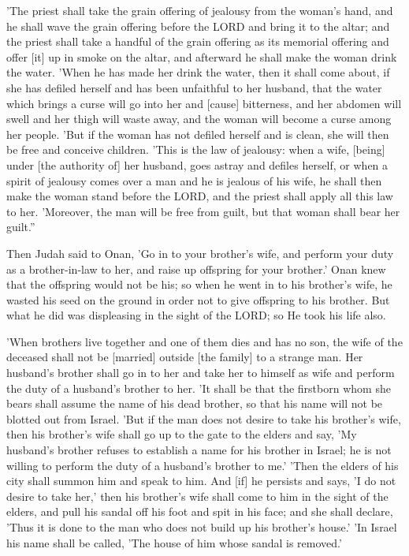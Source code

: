 \begin{scripture}[Numbers 5:11-31]
    'The priest shall take the grain offering of jealousy from the woman's hand, and he shall wave the grain offering before the LORD and bring it to the altar;
    and the priest shall take a handful of the grain offering as its memorial offering and offer [it] up in smoke on the altar, and afterward he shall make the woman drink the water.
    'When he has made her drink the water, then it shall come about, if she has defiled herself and has been unfaithful to her husband, that the water which brings a curse will go into her and [cause] bitterness, and her abdomen will swell and her thigh will waste away, and the woman will become a curse among her people.
    'But if the woman has not defiled herself and is clean, she will then be free and conceive children.
    'This is the law of jealousy: when a wife, [being] under [the authority of] her husband, goes astray and defiles herself,
    or when a spirit of jealousy comes over a man and he is jealous of his wife, he shall then make the woman stand before the LORD, and the priest shall apply all this law to her.
    'Moreover, the man will be free from guilt, but that woman shall bear her guilt.''
\end{scripture}

\begin{scripture}[Genesis 38:8-10]
    Then Judah said to Onan, 'Go in to your brother's wife, and perform your duty as a brother-in-law to her, and raise up offspring for your brother.'
    Onan knew that the offspring would not be his; so when he went in to his brother's wife, he wasted his seed on the ground in order not to give offspring to his brother.
    But what he did was displeasing in the sight of the LORD; so He took his life also.
\end{scripture}

\begin{scripture}[Deuteronomy 25:5-10]
    'When brothers live together and one of them dies and has no son, the wife of the deceased shall not be [married] outside [the family] to a strange man. Her husband's brother shall go in to her and take her to himself as wife and perform the duty of a husband's brother to her.
    'It shall be that the firstborn whom she bears shall assume the name of his dead brother, so that his name will not be blotted out from Israel.
    'But if the man does not desire to take his brother's wife, then his brother's wife shall go up to the gate to the elders and say, 'My husband's brother refuses to establish a name for his brother in Israel; he is not willing to perform the duty of a husband's brother to me.'
    'Then the elders of his city shall summon him and speak to him. And [if] he persists and says, 'I do not desire to take her,'
    then his brother's wife shall come to him in the sight of the elders, and pull his sandal off his foot and spit in his face; and she shall declare, 'Thus it is done to the man who does not build up his brother's house.'
    'In Israel his name shall be called, 'The house of him whose sandal is removed.'
\end{scripture}

